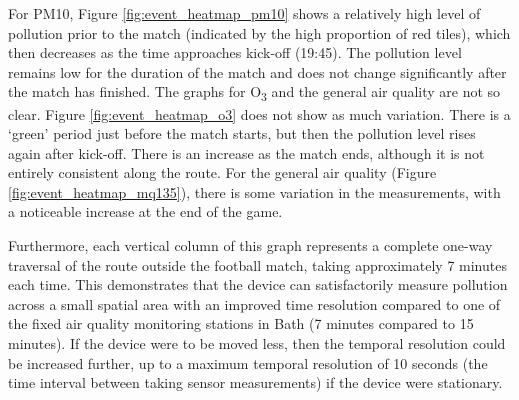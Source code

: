 \documentclass[11pt,twosided,a4paper]{report}
\begin{document}
For PM10, Figure \ref{fig:event_heatmap_pm10} shows a relatively high level of pollution prior to the match (indicated by the high proportion of red tiles), which then decreases as the time approaches kick-off (19:45). The pollution level remains low for the duration of the match and does not change significantly after the match has finished. The graphs for O\textsubscript{3} and the general air quality are not so clear. Figure \ref{fig:event_heatmap_o3} does not show as much variation. There is a `green' period just before the match starts, but then the pollution level rises again after kick-off. There is an increase as the match ends, although it is not entirely consistent along the route. For the general air quality (Figure \ref{fig:event_heatmap_mq135}), there is some variation in the measurements, with a noticeable increase at the end of the game.

Furthermore, each vertical column of this graph represents a complete one-way traversal of the route outside the football match, taking approximately 7 minutes each time. This demonstrates that the device can satisfactorily measure pollution across a small spatial area with an improved time resolution compared to one of the fixed air quality monitoring stations in Bath (7 minutes compared to 15 minutes). If the device were to be moved less, then the temporal resolution could be increased further, up to a maximum temporal resolution of 10 seconds (the time interval between taking sensor measurements) if the device were stationary.

\end{document}
